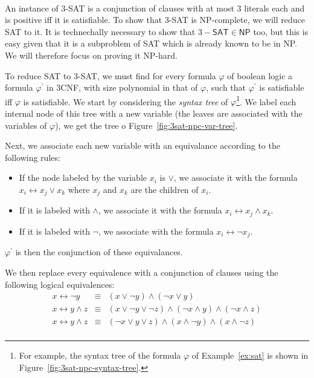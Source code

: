 \begin{example}\ \\
    \label{ex:3sat-npc}
    An instance of 3-\textsf{SAT} is a conjunction of clauses with at most 3 literals each and is positive iff it is satisfiable. To show that 3-\textsf{SAT} is \textsf{NP}-complete, we will reduce \textsf{SAT} to it. It is technechally necessary to show that \(3-\textsf{SAT}\in\textsf{NP}\) too, but this is easy given that it is a subproblem of \textsf{SAT} which is already known to be in \textsf{NP}. We will therefore focus on proving it \textsf{NP}-hard.

    To reduce \textsf{SAT} to 3-\textsf{SAT}, we must find for every formula \(\varphi\) of boolean logic a formula \(\varphi^\prime\) in 3CNF, with size polynomial in that of \(\varphi\), such that \(\varphi^\prime\) is satisfiable iff \(\varphi\) is satisfiable. We start by considering the \emph{syntax tree} of \(\varphi\)\footnote{For example, the syntax tree of the formula \(\varphi\) of Example~\ref{ex:sat} is shown in Figure~\ref{fig:3sat-npc-syntax-tree}.}. We label each internal node of this tree with a new variable (the leaves are associated with the variables of \(\varphi\)), we get the tree o Figure~\ref{fig:3sat-npc-var-tree}.

    Next, we associate each new variable with an equivalance according to the following rules:
    \begin{itemize}
        \item If the node labeled by the variable \(x_i\) is \(\vee\), we associate it with the formula \(x_i \leftrightarrow x_j \vee x_k\) where \(x_j\) and \(x_k\) are the children of \(x_i\).
        \item If it is labeled with \(\wedge\), we associate it with the formula \(x_i \leftrightarrow x_j \wedge x_k\).
        \item If it is labeled with \(\neg\), we associate with the formula \(x_i \leftrightarrow \neg x_j\).
    \end{itemize}

    \(\varphi^\prime\) is then the conjunction of these equivalances.

    We then replace every equivalence with a conjunction of clauses using the following logical equivalences:
    \[
        \begin{array}{ccl}
            x \leftrightarrow \neg y &\equiv& (x\vee\neg y)\wedge (\neg x \vee y) \\
            x \leftrightarrow y \wedge z &\equiv& (x\vee\neg y\vee\neg z) \wedge 
            (\neg x \wedge y) \wedge (\neg x \wedge z) \\
            x \leftrightarrow y \wedge z &\equiv& (\neg x\vee y\vee z) \wedge 
            (x \wedge\neg y) \wedge (x \wedge\neg z) \\
        \end{array}
    \]


\end{example}
